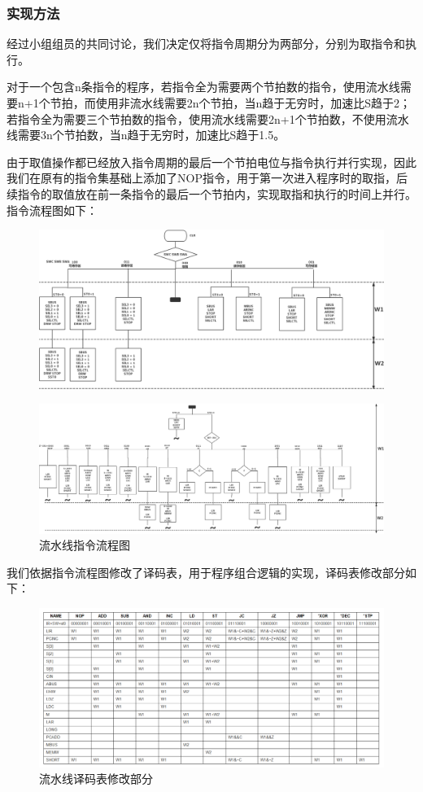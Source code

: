 \subsubsection{实现方法}
\par 
经过小组组员的共同讨论，我们决定仅将指令周期分为两部分，分别为取指令和执行。
\par
对于一个包含n条指令的程序，若指令全为需要两个节拍数的指令，使用流水线需要n+1个节拍，而使用非流水线需要2n个节拍，当n趋于无穷时，加速比S趋于2；若指令全为需要三个节拍数的指令，使用流水线需要2n+1个节拍数，不使用流水线需要3n个节拍数，当n趋于无穷时，加速比S趋于1.5。
\par 
由于取值操作都已经放入指令周期的最后一个节拍电位与指令执行并行实现，因此我们在原有的指令集基础上添加了NOP指令，用于第一次进入程序时的取指，后续指令的取值放在前一条指令的最后一个节拍内，实现取指和执行的时间上并行。指令流程图如下：
\begin{figure}[hbt!]
    \centering
    \label{流水线指令流程图1}
    \includegraphics[width=\textwidth]{figures/chapter3/流水线指令流程图1.png}
\end{figure}
\newpage
\begin{figure}[hbt!]
    \centering
    \label{流水线指令流程图2}
    \includegraphics[width=\textwidth]{figures/chapter3/流水线指令流程图2.png}
    \caption{流水线指令流程图}
\end{figure}
\par
我们依据指令流程图修改了译码表，用于程序组合逻辑的实现，译码表修改部分如下：
\begin{figure}[hbt!]
    \centering
    \label{流水线译码表修改部分}
    \includegraphics[width=\textwidth]{figures/chapter3/流水线译码表修改部分.png}
    \caption{流水线译码表修改部分}
\end{figure}


